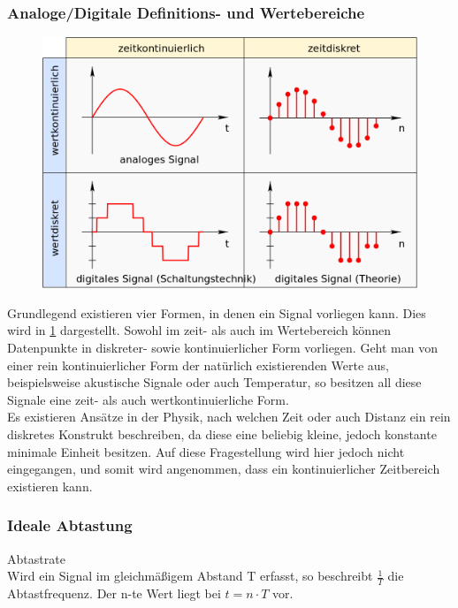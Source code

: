 \subsubsection{Analoge/Digitale Definitions- und Wertebereiche}
\begin{figure}
\centering
\includegraphics[scale=0.4]{images/signals.png}
\label{signals}
\end{figure}
Grundlegend existieren vier Formen, in denen ein Signal vorliegen kann. Dies wird in \ref{signals} dargestellt. Sowohl im zeit- als auch im Wertebereich können Datenpunkte in diskreter- sowie kontinuierlicher Form vorliegen. Geht man von einer rein kontinuierlicher Form der natürlich existierenden Werte aus, beispielsweise akustische Signale oder auch Temperatur, so besitzen all diese Signale eine zeit- als auch wertkontinuierliche Form.\\
Es existieren Ansätze in der Physik, nach welchen Zeit oder auch Distanz ein rein diskretes Konstrukt beschreiben, da diese eine beliebig kleine, jedoch konstante minimale Einheit besitzen. Auf diese Fragestellung wird hier jedoch nicht eingegangen, und somit wird angenommen, dass ein kontinuierlicher Zeitbereich existieren kann.\\
\newpage

\subsubsection{Ideale Abtastung}
\begin{definition}{Abtastrate}\\
Wird ein Signal im gleichmäßigem Abstand T erfasst, so beschreibt $\frac{1}{T}$ die Abtastfrequenz. Der n-te Wert liegt bei $t = n \cdot T$ vor.
\end{definition}

